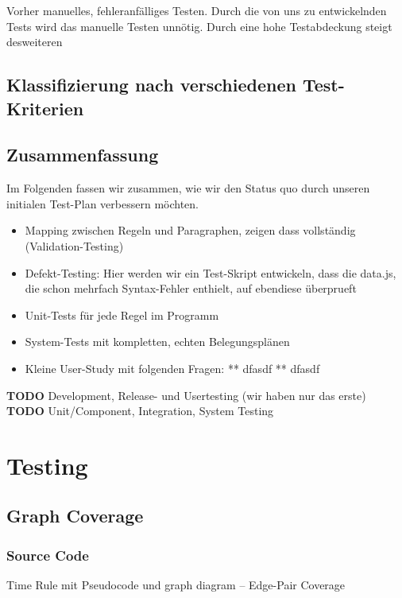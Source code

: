 \documentclass[ngerman]{article}
\begin{document}
Vorher manuelles, fehleranfälliges Testen. Durch die von uns zu
entwickelnden Tests wird das manuelle Testen unnötig. Durch eine hohe
Testabdeckung steigt desweiteren

\subsection{Klassifizierung nach verschiedenen Test-Kriterien}


\subsection{Zusammenfassung}
\label{sec:zusammenfassung}

Im Folgenden fassen wir zusammen, wie wir den Status quo durch unseren
initialen Test-Plan verbessern möchten.

\begin{itemize}
    \item Mapping zwischen Regeln und Paragraphen, zeigen dass vollständig (Validation-Testing)
    \item
        Defekt-Testing: Hier werden wir ein Test-Skript entwickeln, dass die data.js, die schon mehrfach Syntax-Fehler enthielt, auf ebendiese überprueft
    \item
        Unit-Tests für jede Regel im Programm
    \item
        System-Tests mit kompletten, echten Belegungsplänen
    \item
        Kleine User-Study mit folgenden Fragen: ** dfasdf ** dfasdf
\end{itemize}

\textbf{TODO} Development, Release- und Usertesting (wir haben nur das erste) \textbf{TODO} Unit/Component, Integration, System Testing

\section{Testing}

\subsection{Graph Coverage}

\subsubsection{Source Code}
Time Rule mit Pseudocode und graph diagram -- Edge-Pair Coverage
\end{document}
